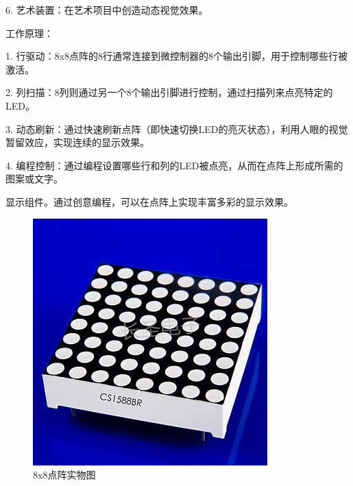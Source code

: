 \documentclass{textreportclass}  %
\begin{document}
	6. 艺术装置：在艺术项目中创造动态视觉效果。
	
工作原理：
	
	1. 行驱动：8x8点阵的8行通常连接到微控制器的8个输出引脚，用于控制哪些行被激活。
	
	2. 列扫描：8列则通过另一个8个输出引脚进行控制，通过扫描列来点亮特定的LED。
	
	3. 动态刷新：通过快速刷新点阵（即快速切换LED的亮灭状态），利用人眼的视觉暂留效应，实现连续的显示效果。
	
	4. 编程控制：通过编程设置哪些行和列的LED被点亮，从而在点阵上形成所需的图案或文字。
	
	显示组件。通过创意编程，可以在点阵上实现丰富多彩的显示效果。
	
	\begin{figure}[htbp]
		\centering
		\includegraphics[scale=0.3]{Fig/点阵实物图.jpg}
		\caption{8x8点阵实物图}\label{Fig.21}
	\end{figure}
	
\end{document}
